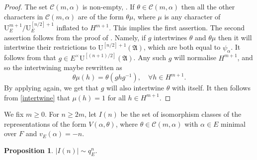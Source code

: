 \documentclass[11pt]{article}
\let\mathcal\mathscr
\newtheorem{prop}{Proposition}[section]
\theoremstyle{definition}
\newcommand{\Aa}{\mathfrak A}
\newcommand{\UU}{\mathrm U}
\begin{document}
\begin{proof} The set $\mathcal C(m, \alpha)$ is non-empty, \cite[(3.3.18)]{BK}. If $\theta\in \mathcal C(m, \alpha)$ then all the other characters
in $\mathcal C(m, \alpha)$ are of the form $\theta \mu$, where $\mu$ is any character of $\UU^{m+1}_E/ \UU^{[n/2]+1}_E$ inflated to $H^{m+1}$.
This implies the first assertion. The second assertion follows from the proof of \cite[Prop.\,7.3]{thesis}.
Namely, if $g$ intertwines $\theta$ and $\theta \mu$ then it will intertwine their restrictions to $\UU^{[n/2]+1}(\Aa)$, which are both equal to
$\psi_{\alpha}$. It follows from \cite[(3.3.2)]{BK} that $g\in E^{\times} \UU^{[(n+1)/2]}(\Aa)$. Any such $g$ will normalise $H^{m+1}$, and so
the intertwining maybe rewritten as
\begin{equation}\label{intertwine}
\theta\mu(h)= \theta(g h g^{-1}), \quad \forall h \in H^{m+1}.
\end{equation}
By applying \cite[(3.3.2)]{BK} again, we get that $g$ will also intertwine $\theta$ with itself. It then follows from \eqref{intertwine} that $\mu(h)=1$
for all $h\in H^{m+1}$.
\end{proof}

We fix $m\ge 0$. For $n\ge 2m$, let $I(n)$ be the set of isomorphism classes of the representations of the form $V(\alpha, \theta)$, where
$\theta\in \mathcal C(m, \alpha)$ with $\alpha\in E$ minimal over $F$ and $v_E(\alpha)=-n$.

\begin{prop}\label{size_I(n)} $|I(n)|\sim q_E^{n}$.
\end{prop}
\end{document}
